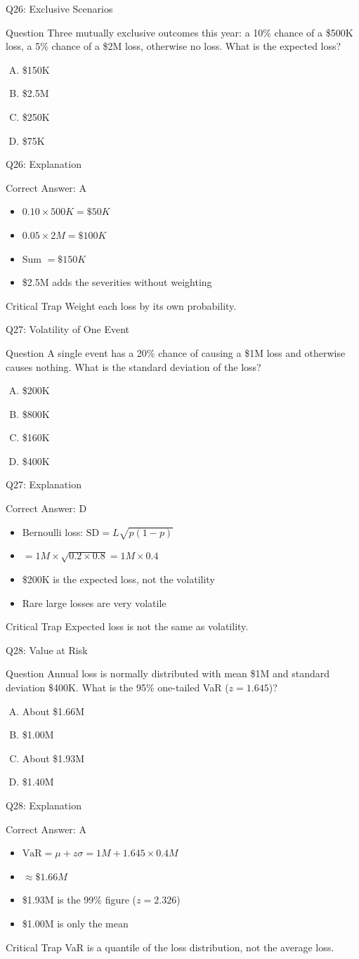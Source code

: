 \documentclass[aspectratio=169]{beamer}
\newcommand{\hq}[7]{%
  \begin{frame}{Q#1: #2}
    \begin{block}{Question}
      #3
    \end{block}
    \begin{enumerate}[(A)]
      #4
    \end{enumerate}
  \end{frame}
  \begin{frame}{Q#1: Explanation}
    \begin{block}{Correct Answer: #5}
      \begin{itemize}
        #6
      \end{itemize}
    \end{block}
    \begin{alertblock}{Critical Trap}
      #7
    \end{alertblock}
  \end{frame}
}
\begin{document}
\hq{26}{Exclusive Scenarios}
{Three mutually exclusive outcomes this year: a 10\% chance of a \$500K loss, a 5\% chance of a \$2M loss, otherwise no loss. What is the expected loss?}
{\item \$150K
 \item \$2.5M
 \item \$250K
 \item \$75K}
{A}
{\item $0.10 \times 500K = \$50K$
 \item $0.05 \times 2M = \$100K$
 \item Sum $= \$150K$
 \item \$2.5M adds the severities without weighting}
{Weight each loss by its own probability.}

\hq{27}{Volatility of One Event}
{A single event has a 20\% chance of causing a \$1M loss and otherwise causes nothing. What is the standard deviation of the loss?}
{\item \$200K
 \item \$800K
 \item \$160K
 \item \$400K}
{D}
{\item Bernoulli loss: $\text{SD} = L\sqrt{p(1-p)}$
 \item $= 1M \times \sqrt{0.2 \times 0.8} = 1M \times 0.4$
 \item \$200K is the expected loss, not the volatility
 \item Rare large losses are very volatile}
{Expected loss is not the same as volatility.}

\hq{28}{Value at Risk}
{Annual loss is normally distributed with mean \$1M and standard deviation \$400K. What is the 95\% one-tailed VaR ($z = 1.645$)?}
{\item About \$1.66M
 \item \$1.00M
 \item About \$1.93M
 \item \$1.40M}
{A}
{\item $\text{VaR} = \mu + z\sigma = 1M + 1.645 \times 0.4M$
 \item $\approx \$1.66M$
 \item \$1.93M is the 99\% figure ($z = 2.326$)
 \item \$1.00M is only the mean}
{VaR is a quantile of the loss distribution, not the average loss.}
\end{document}
